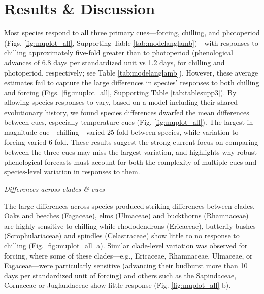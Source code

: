 \documentclass[11pt]{article}
\begin{document}
\section*{Results \& Discussion}

Most species respond to all three primary cues---forcing, chilling, and photoperiod (Figs. \ref{fig:muplot_all}, Supporting Table \ref{tab:modelanglamb})\citep[see also][]{Laube:2014a,ettinger2020}---with responses to chilling approximately five-fold greater than to photoperiod (phenological advances of 6.8 days per standardized unit vs 1.2 days, for chilling and photoperiod, respectively; see Table \ref{tab:modelanglamb}). However, these average estimates fail to capture the large differences in species' responses to both chilling and forcing (Figs. \ref{fig:muplot_all}, Supporting Table \ref{tab:tablesupp3}). By allowing species responses to vary, based on a model including their shared evolutionary history, we found species differences dwarfed the mean differences between cues, especially temperature cues (Fig. \ref{fig:muplot_all}). The largest in magnitude cue---chilling---varied 25-fold between species, while variation to forcing varied 6-fold. These results suggest the strong current focus on comparing between the three cues may miss the largest variation, and highlights why robust phenological forecasts must account for both the complexity of multiple cues and species-level variation in responses to them. %

\emph{Differences across clades \& cues}

The large differences across species produced striking differences between clades. Oaks and beeches (Fagaceae), elms (Ulmaceae) and buckthorns (Rhamnaceae) are highly sensitive to chilling while rhododendrons (Ericaceae), butterfly bushes (Scrophulariaceae) and spindles (Celastraceae) show little to no response to chilling (Fig. \ref{fig:muplot_all} a). %
Similar clade-level variation was observed for forcing, where some of these clades---e.g., Ericaceae, Rhamnaceae, Ulmaceae, or Fagaceae---were particularly sensitive (advancing their budburst more than 10 days per standardized unit of forcing) and others such as the Sapindaceae, Cornaceae or Juglandaceae show little response (Fig. \ref{fig:muplot_all} b). %
\end{document}
